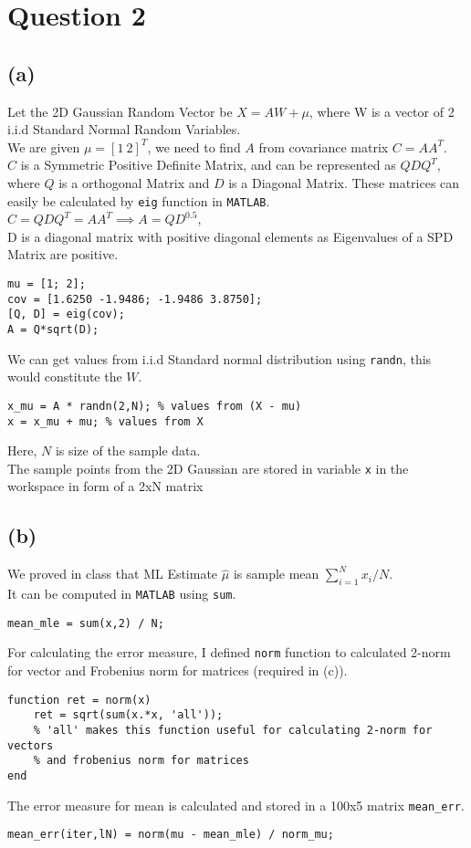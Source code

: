 \documentclass[11pt, fleqn]{article}
\begin{document}
\newpage
\section*{Question 2}
\setcounter{equation}{0}
\setcounter{figure}{0}
\subsection*{(a)}
Let the 2D Gaussian Random Vector be $X = AW + \mu$, where W is a vector of 2 i.i.d Standard Normal Random Variables. \\
We are given $\mu = [1\ 2]^T$, we need to find $A$ from covariance matrix $C = AA^T$. \\
$C$ is a Symmetric Positive Definite Matrix, and can be represented as $QDQ^T$, where $Q$ is a orthogonal Matrix and $D$ is a Diagonal Matrix. These matrices can easily be calculated by \verb!eig! function in \verb!MATLAB!. \\
$C = QDQ^T = AA^T \implies A = QD^{0.5}$, \\
D is a diagonal matrix with positive diagonal elements as Eigenvalues of a SPD Matrix are positive.
\begin{verbatim}
mu = [1; 2];
cov = [1.6250 -1.9486; -1.9486 3.8750];
[Q, D] = eig(cov);
A = Q*sqrt(D);
\end{verbatim}
We can get values from i.i.d Standard normal distribution using \verb!randn!, this would constitute the $W$.
\begin{verbatim}
x_mu = A * randn(2,N); % values from (X - mu)
x = x_mu + mu; % values from X
\end{verbatim}
Here, $N$ is size of the sample data. \\
The sample points from the 2D Gaussian are stored in variable \verb!x! in the workspace in form of a 2xN matrix

\subsection*{(b)}
We proved in class that ML Estimate $\hat{\mu}$ is sample mean $\sum_{i=1}^N x_i / N$.\\
It can be computed in \verb!MATLAB! using \verb!sum!.
\begin{verbatim}
mean_mle = sum(x,2) / N;
\end{verbatim}
For calculating the error measure, I defined \verb!norm! function to calculated 2-norm for vector and Frobenius norm for matrices (required in (c)).
\begin{verbatim}
function ret = norm(x)
    ret = sqrt(sum(x.*x, 'all'));
    % 'all' makes this function useful for calculating 2-norm for vectors
    % and frobenius norm for matrices
end
\end{verbatim}
The error measure for mean is calculated and stored in a 100x5 matrix \verb!mean_err!.
\begin{verbatim}
mean_err(iter,lN) = norm(mu - mean_mle) / norm_mu;
\end{verbatim}
\end{document}
